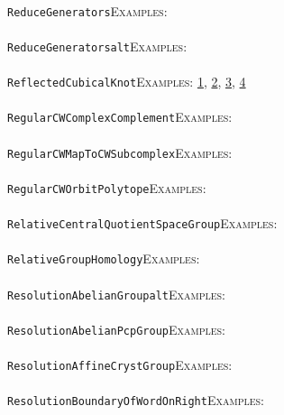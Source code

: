 \documentclass[a4paper,11pt]{report}
\begin{document}
{{ \\
 \texttt{ReduceGenerators}{\nobreakspace}{\nobreakspace}{\nobreakspace}{\nobreakspace}\textsc{Examples:} \\
 \\
 \texttt{ReduceGenerators{\textunderscore}alt}{\nobreakspace}{\nobreakspace}{\nobreakspace}{\nobreakspace}\textsc{Examples:} \\
 \\
 \texttt{ReflectedCubicalKnot}{\nobreakspace}{\nobreakspace}{\nobreakspace}{\nobreakspace}\textsc{Examples:} \href{tutorial/chap2.html} {1}{\nobreakspace}, \href{tutorial/chap3.html} {2}{\nobreakspace}, \href{tutorial/chap5.html} {3}{\nobreakspace}, \href{../www/SideLinks/About/aboutCoverinSpaces.html} {4}{\nobreakspace} \\
 \\
 \texttt{RegularCWComplexComplement}{\nobreakspace}{\nobreakspace}{\nobreakspace}{\nobreakspace}\textsc{Examples:} \\
 \\
 \texttt{RegularCWMapToCWSubcomplex}{\nobreakspace}{\nobreakspace}{\nobreakspace}{\nobreakspace}\textsc{Examples:} \\
 \\
 \texttt{RegularCWOrbitPolytope}{\nobreakspace}{\nobreakspace}{\nobreakspace}{\nobreakspace}\textsc{Examples:} \\
 \\
 \texttt{RelativeCentralQuotientSpaceGroup}{\nobreakspace}{\nobreakspace}{\nobreakspace}{\nobreakspace}\textsc{Examples:} \\
 \\
 \texttt{RelativeGroupHomology}{\nobreakspace}{\nobreakspace}{\nobreakspace}{\nobreakspace}\textsc{Examples:} \\
 \\
 \texttt{ResolutionAbelianGroup{\textunderscore}alt}{\nobreakspace}{\nobreakspace}{\nobreakspace}{\nobreakspace}\textsc{Examples:} \\
 \\
 \texttt{ResolutionAbelianPcpGroup}{\nobreakspace}{\nobreakspace}{\nobreakspace}{\nobreakspace}\textsc{Examples:} \\
 \\
 \texttt{ResolutionAffineCrystGroup}{\nobreakspace}{\nobreakspace}{\nobreakspace}{\nobreakspace}\textsc{Examples:} \\
 \\
 \texttt{ResolutionBoundaryOfWordOnRight}{\nobreakspace}{\nobreakspace}{\nobreakspace}{\nobreakspace}\textsc{Examples:} \\
}}
\end{document}
